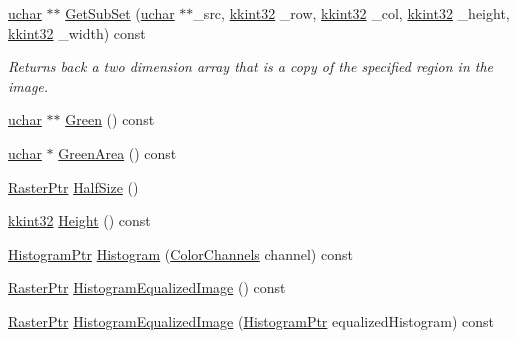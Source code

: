 \begin{DoxyCompactItemize}
\item 
\hyperlink{namespace_k_k_b_ace9969169bf514f9ee6185186949cdf7}{uchar} $\ast$$\ast$ \hyperlink{class_k_k_b_1_1_raster_a1c19f5defb24cb5176ff1be50b42f091}{Get\+Sub\+Set} (\hyperlink{namespace_k_k_b_ace9969169bf514f9ee6185186949cdf7}{uchar} $\ast$$\ast$\+\_\+src, \hyperlink{namespace_k_k_b_a8fa4952cc84fda1de4bec1fbdd8d5b1b}{kkint32} \+\_\+row, \hyperlink{namespace_k_k_b_a8fa4952cc84fda1de4bec1fbdd8d5b1b}{kkint32} \+\_\+col, \hyperlink{namespace_k_k_b_a8fa4952cc84fda1de4bec1fbdd8d5b1b}{kkint32} \+\_\+height, \hyperlink{namespace_k_k_b_a8fa4952cc84fda1de4bec1fbdd8d5b1b}{kkint32} \+\_\+width) const 
\begin{DoxyCompactList}\small\item\em Returns back a two dimension array that is a copy of the specified region in the image. \end{DoxyCompactList}\item 
\hyperlink{namespace_k_k_b_ace9969169bf514f9ee6185186949cdf7}{uchar} $\ast$$\ast$ \hyperlink{class_k_k_b_1_1_raster_a2dbd81f2cb60b3716bcf6467050dde93}{Green} () const 
\item 
\hyperlink{namespace_k_k_b_ace9969169bf514f9ee6185186949cdf7}{uchar} $\ast$ \hyperlink{class_k_k_b_1_1_raster_af6ceacfa7835a295d239d141627dbec7}{Green\+Area} () const 
\item 
\hyperlink{class_k_k_b_1_1_raster_aefa532857fd6aa9eb53f79da55a97c5a}{Raster\+Ptr} \hyperlink{class_k_k_b_1_1_raster_a6d1c81a622ccfcf9e738198a409b3c88}{Half\+Size} ()
\item 
\hyperlink{namespace_k_k_b_a8fa4952cc84fda1de4bec1fbdd8d5b1b}{kkint32} \hyperlink{class_k_k_b_1_1_raster_af8d10d15697d5b92fb9595c48b529feb}{Height} () const 
\item 
\hyperlink{namespace_k_k_b_a48b9611558f2c43f7ee877adb475b286}{Histogram\+Ptr} \hyperlink{class_k_k_b_1_1_raster_ae50c283424d3fbbdea957a3ff955909f}{Histogram} (\hyperlink{namespace_k_k_b_a91743d17eafa05c7ff4e08017ac2b718}{Color\+Channels} channel) const 
\item 
\hyperlink{class_k_k_b_1_1_raster_aefa532857fd6aa9eb53f79da55a97c5a}{Raster\+Ptr} \hyperlink{class_k_k_b_1_1_raster_a9ed877aa9bf8ec0bd7c4c2ec0eabfe6a}{Histogram\+Equalized\+Image} () const 
\item 
\hyperlink{class_k_k_b_1_1_raster_aefa532857fd6aa9eb53f79da55a97c5a}{Raster\+Ptr} \hyperlink{class_k_k_b_1_1_raster_a1990483c71de66a962a20c19c00a8fdc}{Histogram\+Equalized\+Image} (\hyperlink{namespace_k_k_b_a48b9611558f2c43f7ee877adb475b286}{Histogram\+Ptr} equalized\+Histogram) const 
$$
\end{DoxyCompactItemize}
